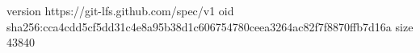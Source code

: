 version https://git-lfs.github.com/spec/v1
oid sha256:cca4cdd5cf5dd31c4e8a95b38d1c606754780ceea3264ac82f7f8870ffb7d16a
size 43840
